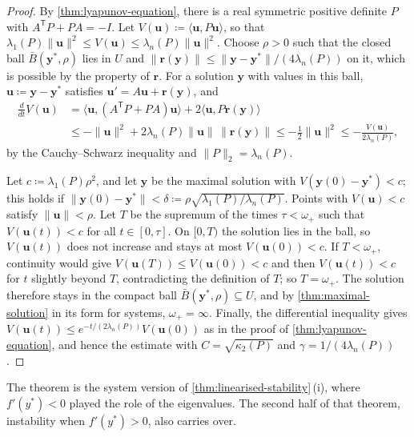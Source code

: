 \begin{proof}
By \cref{thm:lyapunov-equation}, there is a real symmetric positive definite $P$ with $A^{\mathsf T}P+PA=-I$. Let $V(\mathbf u)\coloneqq\langle\mathbf u,P\mathbf u\rangle$, so that $\lambda_1(P)\|\mathbf u\|^2\le V(\mathbf u)\le\lambda_n(P)\|\mathbf u\|^2$. Choose $\rho>0$ such that the closed ball $\bar B(\mathbf y^*,\rho)$ lies in $U$ and $\|\mathbf r(\mathbf y)\|\le\|\mathbf y-\mathbf y^*\|/(4\lambda_n(P))$ on it, which is possible by the property of $\mathbf r$. For a solution $\mathbf y$ with values in this ball, $\mathbf u\coloneqq\mathbf y-\mathbf y^*$ satisfies $\mathbf u'=A\mathbf u+\mathbf r(\mathbf y)$, and
\[
\begin{aligned}
\frac d{dt}V(\mathbf u)&=\langle\mathbf u,(A^{\mathsf T}P+PA)\mathbf u\rangle+2\langle\mathbf u,P\mathbf r(\mathbf y)\rangle\\
&\le-\|\mathbf u\|^2+2\lambda_n(P)\|\mathbf u\|\,\|\mathbf r(\mathbf y)\|\le-\frac12\|\mathbf u\|^2\le-\frac{V(\mathbf u)}{2\lambda_n(P)},
\end{aligned}
\]
by the Cauchy--Schwarz inequality and $\|P\|_2=\lambda_n(P)$.

Let $c\coloneqq\lambda_1(P)\rho^2$, and let $\mathbf y$ be the maximal solution with $V(\mathbf y(0)-\mathbf y^*)<c$; this holds if $\|\mathbf y(0)-\mathbf y^*\|<\delta\coloneqq\rho\sqrt{\lambda_1(P)/\lambda_n(P)}$. Points with $V(\mathbf u)<c$ satisfy $\|\mathbf u\|<\rho$. Let $T$ be the supremum of the times $\tau<\omega_+$ such that $V(\mathbf u(t))<c$ for all $t\in[0,\tau]$. On $[0,T)$ the solution lies in the ball, so $V(\mathbf u(t))$ does not increase and stays at most $V(\mathbf u(0))<c$. If $T<\omega_+$, continuity would give $V(\mathbf u(T))\le V(\mathbf u(0))<c$ and then $V(\mathbf u(t))<c$ for $t$ slightly beyond $T$, contradicting the definition of $T$; so $T=\omega_+$. The solution therefore stays in the compact ball $\bar B(\mathbf y^*,\rho)\subseteq U$, and by \cref{thm:maximal-solution} in its form for systems, $\omega_+=\infty$. Finally, the differential inequality gives $V(\mathbf u(t))\le e^{-t/(2\lambda_n(P))}V(\mathbf u(0))$ as in the proof of \cref{thm:lyapunov-equation}, and hence the estimate with $C=\sqrt{\kappa_2(P)}$ and $\gamma=1/(4\lambda_n(P))$.
\end{proof}

The theorem is the system version of \cref{thm:linearised-stability}\,(i), where $f'(y^*)<0$ played the role of the eigenvalues. The second half of that theorem, instability when $f'(y^*)>0$, also carries over.

